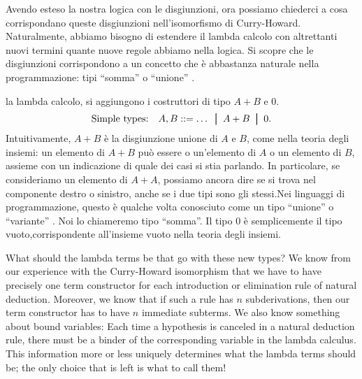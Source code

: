 \documentclass{article}
\begin{document}
Avendo esteso la nostra logica con le disgiunzioni, ora possiamo chiederci
a cosa  corrispondano queste disgiunzioni nell'isomorfismo di Curry-Howard.
Naturalmente, abbiamo bisogno di estendere il lambda calcolo con altrettanti
nuovi termini quante nuove regole abbiamo  nella logica. Si scopre che le
disgiunzioni corrispondono a un concetto che \`e abbastanza naturale nella
programmazione: tipi ``somma'' o ``unione'' . 

la lambda calcolo, si aggiungono i costruttori di tipo $A+B$ e $0$.
\[ \mbox{Simple types:}\ssep A,B \bnf \ldots\bor A+B\bor 0.
\]
Intuitivamente, $A+B$ \`e la disgiunzione unione di $A$ e $B$, come nella teoria
degli insiemi: un elemento di $A+B$ pu\`o essere o un'elemento di $A$ o un elemento
di $B$, assieme con un indicazione di quale dei casi si stia parlando. In
particolare, se consideriamo un elemento di $A+A$, possiamo ancora dire se
si trova nel componente destro o sinistro, anche se i due
tipi sono gli stessi.Nei linguaggi di programmazione, questo è qualche volta conosciuto
come un tipo ``unione'' o ``variante'' . Noi lo chiameremo tipo ``somma''.
Il tipo  $0$ \`e semplicemente il tipo vuoto,corrispondente all'insieme vuoto
nella teoria degli insiemi.

What should the lambda terms be that go with these new types?  We know
from our experience with the Curry-Howard isomorphism that we have to
have precisely one term constructor for each introduction or
elimination rule of natural deduction. Moreover, we know that if such
a rule has $n$ subderivations, then our term constructor has to have
$n$ immediate subterms. We also know something about bound variables:
Each time a hypothesis is canceled in a natural deduction rule, there
must be a binder of the corresponding variable in the lambda calculus.
This information more or less uniquely determines what the lambda
terms should be; the only choice that is left is what to call them!
\end{document}
